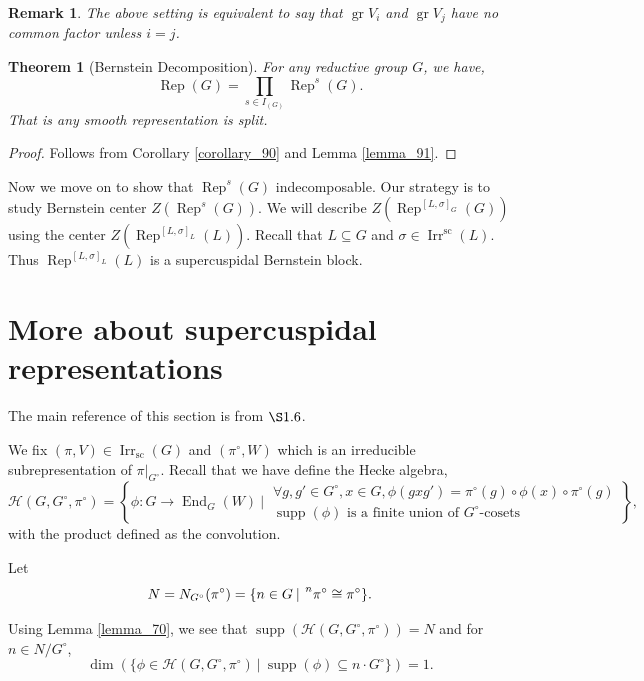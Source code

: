 \documentclass[8pt]{article}
\newtheorem{theorem}{Theorem} [section]
\newtheorem{remark}{Remark}[section]
\DeclareMathOperator{\Rep}{Rep}
\DeclareMathOperator{\End}{End}
\DeclareMathOperator{\supp}{supp}
\DeclareMathOperator{\gr}{gr}
\DeclareMathOperator{\supcus}{sc}
\DeclareMathOperator{\Irr}{Irr}
\newcommand{\sep}[0]{\:|\:}
\newcommand{\hecke}[0]{\mathscr{H}}
\begin{document}
\begin{remark}
  The above setting is equivalent to say that $\gr V_i$ and $\gr V_j$ have no common factor unless $i=j$.
\end{remark}

\begin{theorem}[Bernstein Decomposition]
  For any reductive group $G$, we have,
  \begin{equation*}
    \Rep(G)  = \prod_{s\in I_(G)}\Rep^s(G).
  \end{equation*}
  That is any smooth representation is split.
\end{theorem}

\begin{proof}
  Follows from Corollary \ref{corollary_90} and Lemma \ref{lemma_91}.
\end{proof}

Now we move on to show that $\Rep^s(G)$ indecomposable. Our strategy is to study Bernstein center $Z(\Rep^s(G))$. We will describe $Z(\Rep^{[L,\sigma]_G}(G))$ using the center $Z(\Rep^{[L,\sigma]_L}(L))$. Recall that $L\subseteq G$ and $\sigma\in\Irr^{\supcus}(L)$. Thus 
$\Rep^{[L,\sigma]_L}(L)$ is a supercuspidal Bernstein block.

\section{More about supercuspidal representations}

The main reference of this section is from \cite{Roche} $\S1.6$.

We fix $(\pi,V)\in\Irr_{\supcus}(G)$ and $(\pi^\circ,W)$ which is an irreducible subrepresentation of $\pi|_{G^\circ}$. Recall that we have define the Hecke algebra,
\begin{equation*}
  \hecke(G,G^\circ,\pi^\circ) = \left\{\phi:G\to\End_G(W)\sep \substack{\forall g,g'\in G^\circ, x\in G,\phi(gxg') = \pi^\circ(g)\circ\phi(x)\circ\pi^\circ(g)\\ \supp(\phi) \text{ is a finite union of $G^\circ$-cosets}}\right\},
\end{equation*}
with the product defined as the convolution. 
\par Let 
\begin{equation*}
  N = N_{G^\circ}(\pi^\circ) = \{n\in G\sep \prescript{n}{}{\pi^\circ} \cong \pi^\circ\}.
\end{equation*}

Using Lemma \ref{lemma_70}, we see that $\supp(\hecke(G,G^\circ,\pi^\circ)) = N$ and for $n\in N/G^\circ$,
\begin{equation*}
  \dim(\{\phi\in\hecke(G,G^\circ,\pi^\circ)\sep \supp(\phi)\subseteq n\cdot G^\circ\}) = 1.
\end{equation*}
\end{document}
